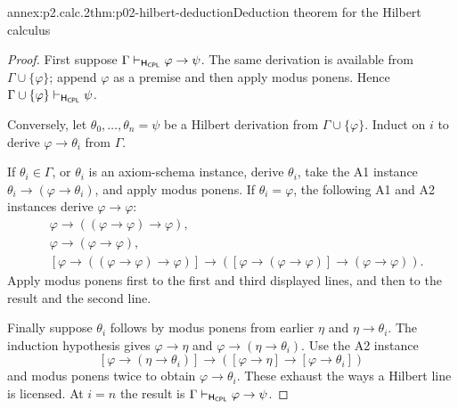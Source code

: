 \begin{annexitem}{annex:p2.calc.2}{thm:p02-hilbert-deduction}{Deduction theorem for the Hilbert calculus}
\begin{proof}
First suppose
\(\Gamma\vdash_{\mathsf H_{\mathsf{CPL}}}\varphi\to\psi\).
The same derivation is available from \(\Gamma\cup\{\varphi\}\); append
\(\varphi\) as a premise and then apply modus ponens.  Hence
\(\Gamma\cup\{\varphi\}\vdash_{\mathsf H_{\mathsf{CPL}}}\psi\).

Conversely, let \(\theta_0,\ldots,\theta_n=\psi\) be a Hilbert derivation
from \(\Gamma\cup\{\varphi\}\).  Induct on \(i\) to derive
\(\varphi\to\theta_i\) from \(\Gamma\).

If \(\theta_i\in\Gamma\), or \(\theta_i\) is an axiom-schema instance,
derive \(\theta_i\), take the A1 instance
\(\theta_i\to(\varphi\to\theta_i)\), and apply modus ponens.  If
\(\theta_i=\varphi\), the following A1 and A2 instances derive
\(\varphi\to\varphi\):
\[
\begin{aligned}
 &\varphi\to((\varphi\to\varphi)\to\varphi),\\
 &\varphi\to(\varphi\to\varphi),\\
 &[\varphi\to((\varphi\to\varphi)\to\varphi)]
   \to([\varphi\to(\varphi\to\varphi)]
   \to(\varphi\to\varphi)).
\end{aligned}
\]
Apply modus ponens first to the first and third displayed lines, and then to
the result and the second line.

Finally suppose \(\theta_i\) follows by modus ponens from earlier
\(\eta\) and \(\eta\to\theta_i\).  The induction hypothesis gives
\(\varphi\to\eta\) and \(\varphi\to(\eta\to\theta_i)\).  Use the A2
instance
\[
 [\varphi\to(\eta\to\theta_i)]
 \to([\varphi\to\eta]\to[\varphi\to\theta_i])
\]
and modus ponens twice to obtain \(\varphi\to\theta_i\).  These exhaust
the ways a Hilbert line is licensed.  At \(i=n\) the result is
\(\Gamma\vdash_{\mathsf H_{\mathsf{CPL}}}\varphi\to\psi\).
\end{proof}
\end{annexitem}
